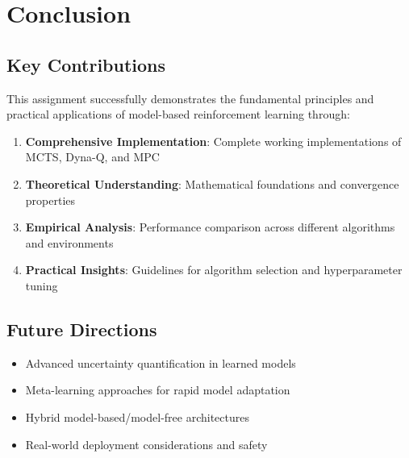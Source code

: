 \documentclass[12pt]{article}
\numberwithin{equation}{section}
\numberwithin{figure}{section}
\numberwithin{table}{section}
\numberwithin{algorithm}{section}
\begin{document}
{{{%
\section{Conclusion}

\subsection{Key Contributions}
This assignment successfully demonstrates the fundamental principles and practical applications of model-based reinforcement learning through:

\begin{enumerate}
    \item \textbf{Comprehensive Implementation}: Complete working implementations of MCTS, Dyna-Q, and MPC
    \item \textbf{Theoretical Understanding}: Mathematical foundations and convergence properties
    \item \textbf{Empirical Analysis}: Performance comparison across different algorithms and environments
    \item \textbf{Practical Insights}: Guidelines for algorithm selection and hyperparameter tuning
\end{enumerate}

\subsection{Future Directions}
\begin{itemize}
    \item Advanced uncertainty quantification in learned models
    \item Meta-learning approaches for rapid model adaptation
    \item Hybrid model-based/model-free architectures
    \item Real-world deployment considerations and safety
\end{itemize}

}}}
\end{document}
